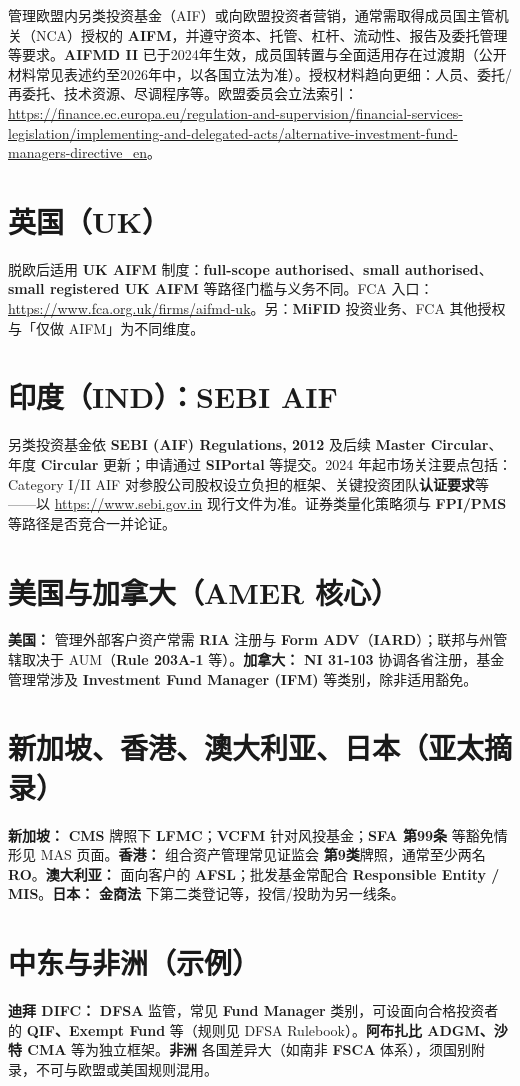 管理欧盟内另类投资基金（AIF）或向欧盟投资者营销，通常需取得成员国主管机关（NCA）授权的 \textbf{AIFM}，并遵守资本、托管、杠杆、流动性、报告及委托管理等要求。\textbf{AIFMD II} 已于2024年生效，成员国转置与全面适用存在过渡期（公开材料常见表述约至2026年中，以各国立法为准）。授权材料趋向更细：人员、委托/再委托、技术资源、尽调程序等。欧盟委员会立法索引：\url{https://finance.ec.europa.eu/regulation-and-supervision/financial-services-legislation/implementing-and-delegated-acts/alternative-investment-fund-managers-directive_en}。

\section{英国（UK）}

脱欧后适用 \textbf{UK AIFM} 制度：\textbf{full-scope authorised}、\textbf{small authorised}、\textbf{small registered UK AIFM} 等路径门槛与义务不同。FCA 入口：\url{https://www.fca.org.uk/firms/aifmd-uk}。另：\textbf{MiFID} 投资业务、FCA 其他授权与「仅做 AIFM」为不同维度。

\section{印度（IND）：SEBI AIF}

另类投资基金依 \textbf{SEBI (AIF) Regulations, 2012} 及后续 \textbf{Master Circular}、年度 \textbf{Circular} 更新；申请通过 \textbf{SIPortal} 等提交。2024 年起市场关注要点包括：Category I/II AIF 对参股公司股权设立负担的框架、关键投资团队\textbf{认证要求}等——以 \url{https://www.sebi.gov.in} 现行文件为准。证券类量化策略须与 \textbf{FPI/PMS} 等路径是否竞合一并论证。

\section{美国与加拿大（AMER 核心）}

\textbf{美国：} 管理外部客户资产常需 \textbf{RIA} 注册与 \textbf{Form ADV}（\textbf{IARD}）；联邦与州管辖取决于 AUM（\textbf{Rule 203A-1} 等）。\textbf{加拿大：} \textbf{NI 31-103} 协调各省注册，基金管理常涉及 \textbf{Investment Fund Manager (IFM)} 等类别，除非适用豁免。

\section{新加坡、香港、澳大利亚、日本（亚太摘录）}

\textbf{新加坡：} \textbf{CMS} 牌照下 \textbf{LFMC}；\textbf{VCFM} 针对风投基金；\textbf{SFA 第99条} 等豁免情形见 MAS 页面。\textbf{香港：} 组合资产管理常见证监会 \textbf{第9类}牌照，通常至少两名 \textbf{RO}。\textbf{澳大利亚：} 面向客户的 \textbf{AFSL}；批发基金常配合 \textbf{Responsible Entity / MIS}。\textbf{日本：} \textbf{金商法} 下第二类登记等，投信/投助为另一线条。

\section{中东与非洲（示例）}

\textbf{迪拜 DIFC：} \textbf{DFSA} 监管，常见 \textbf{Fund Manager} 类别，可设面向合格投资者的 \textbf{QIF、Exempt Fund} 等（规则见 DFSA Rulebook）。\textbf{阿布扎比 ADGM、沙特 CMA} 等为独立框架。\textbf{非洲} 各国差异大（如南非 \textbf{FSCA} 体系），须国别附录，不可与欧盟或美国规则混用。
